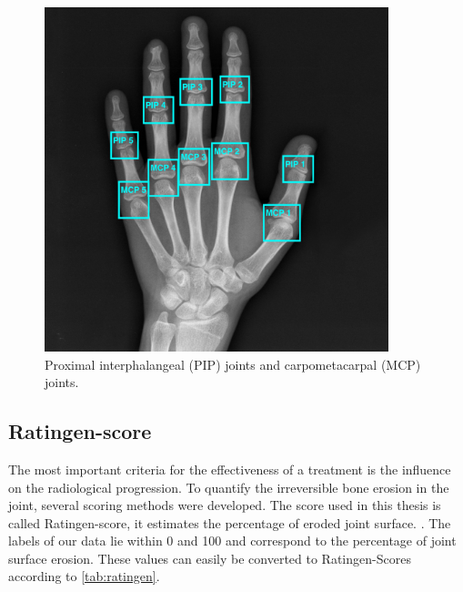 \documentclass[12pt]{article}
\begin{document}
\begin{figure}[ht]
\includegraphics[width=10cm]{joints}	
\caption{Proximal interphalangeal (PIP) joints and carpometacarpal  (MCP) joints.}
\label{fig:joints}
\end{figure}

\subsection{Ratingen-score}
\label{subsec:ratingen}

The most important criteria for the effectiveness of a treatment is the influence on the radiological progression. To quantify the irreversible bone erosion in the joint, several scoring methods were developed. The score used in this thesis is called Ratingen-score, it estimates the percentage of eroded joint surface. \cite{rau_2007}. The labels of our data lie within 0 and 100 and correspond to the percentage of joint surface erosion. These values can easily be converted to Ratingen-Scores according to \autoref{tab:ratingen}.
\end{document}
